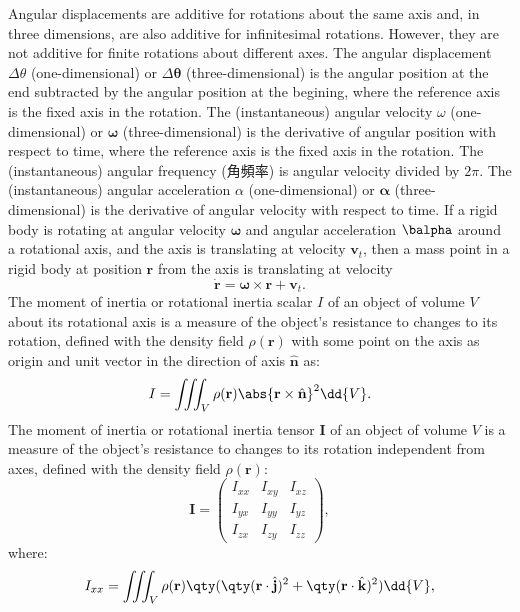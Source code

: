 \documentclass[a4paper,12pt]{article}
\begin{document}
Angular displacements are additive for rotations about the same axis and, in three dimensions, are also additive for infinitesimal rotations. However, they are not additive for finite rotations about different axes.
The angular displacement $\Delta\theta$ (one-dimensional) or $\Delta\boldsymbol{\theta}$ (three-dimensional) is the angular position at the end subtracted by the angular position at the begining, where the reference axis is the fixed axis in the rotation.
The (instantaneous) angular velocity $\omega$ (one-dimensional) or $\boldsymbol{\omega}$ (three-dimensional) is the derivative of angular position with respect to time, where the reference axis is the fixed axis in the rotation. The (instantaneous) angular frequency (角頻率) is angular velocity divided by $2\pi$.
The (instantaneous) angular acceleration $\alpha$ (one-dimensional) or $\boldsymbol{\alpha}$ (three-dimensional) is the derivative of angular velocity with respect to time.
If a rigid body is rotating at angular velocity $\boldsymbol{\omega}$ and angular acceleration $\balpha$ around a rotational axis, and the axis is translating at velocity $\mathbf{v}_t$, then a mass point in a rigid body at position $\mathbf{r}$ from the axis is translating at velocity
\[\dot{\mathbf{r}}=\boldsymbol{\omega}\times\mathbf{r}+\mathbf{v}_t.\]
The moment of inertia or rotational inertia scalar $I$ of an object of volume $V$ about its rotational axis is a measure of the object's resistance to changes to its rotation, defined with the density field $\rho(\mathbf{r})$ with some point on the axis as origin and unit vector in the direction of axis $\hat{\mathbf{n}}$ as:
\[I=\iiint_V\rho(\mathbf{r})\abs{\mathbf{r}\times\hat{\mathbf{n}}}^2\dd{V}.\]
The moment of inertia or rotational inertia tensor $\mathbf{I}$ of an object of volume $V$ is a measure of the object's resistance to changes to its rotation independent from axes, defined with the density field $\rho(\mathbf{r})$:
\[\mathbf{I}=\begin{pmatrix}
    I_{xx} & I_{xy} & I_{xz}\\
    I_{yx} & I_{yy} & I_{yz}\\
    I_{zx} & I_{zy} & I_{zz}
\end{pmatrix},\]
where:
\[I_{xx}=\iiint_V\rho(\mathbf{r})\qty(\qty(\mathbf{r}\cdot\hat{\mathbf{j}})^2+\qty(\mathbf{r}\cdot\hat{\mathbf{k}})^2)\dd{V},\]
\end{document}
